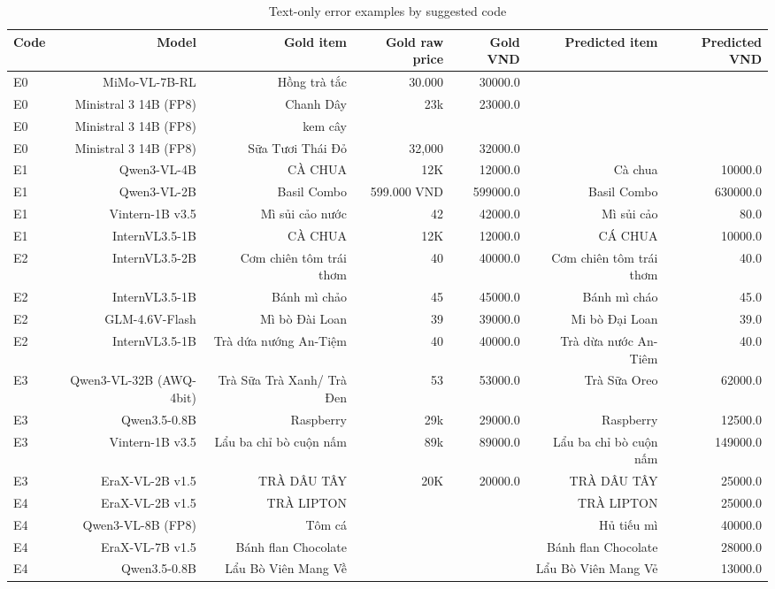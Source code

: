 \begin{table}[t]
\centering
\caption{Text-only error examples by suggested code}
\label{tab:errorexamples}
\small
\begin{tabular}{lrrrrrr}
\toprule
Code & Model & Gold item & Gold raw price & Gold VND & Predicted item & Predicted VND \\
\midrule
E0 & MiMo-VL-7B-RL & Hồng trà tắc & 30.000 & 30000.0 &  &  \\
E0 & Ministral 3 14B (FP8) & Chanh Dây & 23k & 23000.0 &  &  \\
E0 & Ministral 3 14B (FP8) & kem cây &  &  &  &  \\
E0 & Ministral 3 14B (FP8) & Sữa Tươi Thái Đỏ & 32,000 & 32000.0 &  &  \\
E1 & Qwen3-VL-4B & CÀ CHUA & 12K & 12000.0 & Cà chua & 10000.0 \\
E1 & Qwen3-VL-2B & Basil Combo & 599.000 VND & 599000.0 & Basil Combo & 630000.0 \\
E1 & Vintern-1B v3.5 & Mì sủi cảo nước & 42 & 42000.0 & Mì sủi cảo & 80.0 \\
E1 & InternVL3.5-1B & CÀ CHUA & 12K & 12000.0 & CÁ CHUA & 10000.0 \\
E2 & InternVL3.5-2B & Cơm chiên tôm trái thơm & 40 & 40000.0 & Cơm chiên tôm trái thơm & 40.0 \\
E2 & InternVL3.5-1B & Bánh mì chảo & 45 & 45000.0 & Bánh mì cháo & 45.0 \\
E2 & GLM-4.6V-Flash & Mì bò Đài Loan & 39 & 39000.0 & Mi bò Đại Loan & 39.0 \\
E2 & InternVL3.5-1B & Trà dứa nướng An-Tiệm & 40 & 40000.0 & Trà dừa nước An- Tiêm & 40.0 \\
E3 & Qwen3-VL-32B (AWQ-4bit) & Trà Sữa Trà Xanh/ Trà Đen & 53 & 53000.0 & Trà Sữa Oreo & 62000.0 \\
E3 & Qwen3.5-0.8B & Raspberry & 29k & 29000.0 & Raspberry & 12500.0 \\
E3 & Vintern-1B v3.5 & Lẩu ba chỉ bò cuộn nấm & 89k & 89000.0 & Lẩu ba chỉ bò cuộn nấm & 149000.0 \\
E3 & EraX-VL-2B v1.5 & TRÀ DÂU TÂY & 20K & 20000.0 & TRÀ DÂU TÂY & 25000.0 \\
E4 & EraX-VL-2B v1.5 & TRÀ LIPTON &  &  & TRÀ LIPTON & 25000.0 \\
E4 & Qwen3-VL-8B (FP8) & Tôm cá &  &  & Hủ tiếu mì & 40000.0 \\
E4 & EraX-VL-7B v1.5 & Bánh flan Chocolate &  &  & Bánh flan Chocolate & 28000.0 \\
E4 & Qwen3.5-0.8B & Lẩu Bò Viên Mang Về &  &  & Lẩu Bò Viên Mang Vẻ & 13000.0 \\

\end{tabular}
\end{table}
